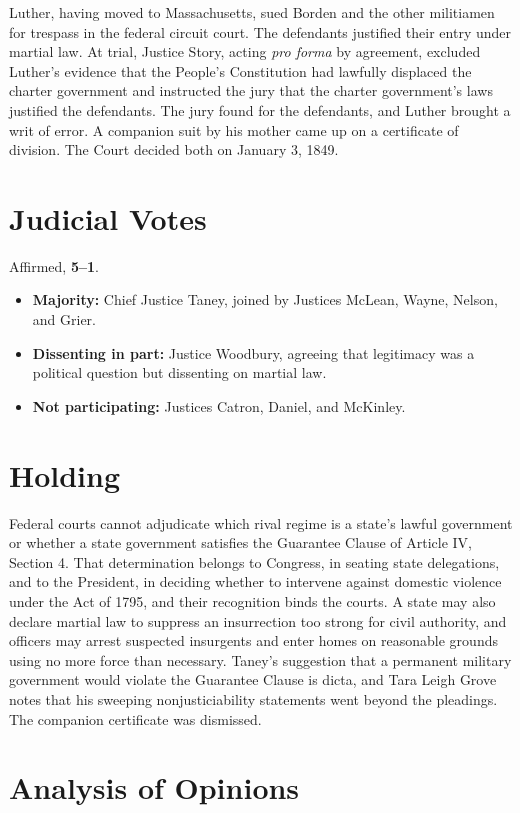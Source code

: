 \documentclass[12pt]{article}
\begin{document}
Luther, having moved to Massachusetts, sued Borden and the other militiamen for trespass in the federal circuit court. The defendants justified their entry under martial law. At trial, Justice Story, acting \textit{pro forma} by agreement, excluded Luther's evidence that the People's Constitution had lawfully displaced the charter government and instructed the jury that the charter government's laws justified the defendants. The jury found for the defendants, and Luther brought a writ of error. A companion suit by his mother came up on a certificate of division. The Court decided both on January 3, 1849.

\section{Judicial Votes}

Affirmed, \textbf{5--1}.
\begin{itemize}
\item \textbf{Majority:} Chief Justice Taney, joined by Justices McLean, Wayne, Nelson, and Grier.
\item \textbf{Dissenting in part:} Justice Woodbury, agreeing that legitimacy was a political question but dissenting on martial law.
\item \textbf{Not participating:} Justices Catron, Daniel, and McKinley.
\end{itemize}

\section{Holding}

Federal courts cannot adjudicate which rival regime is a state's lawful government or whether a state government satisfies the Guarantee Clause of Article IV, Section 4. That determination belongs to Congress, in seating state delegations, and to the President, in deciding whether to intervene against domestic violence under the Act of 1795, and their recognition binds the courts. A state may also declare martial law to suppress an insurrection too strong for civil authority, and officers may arrest suspected insurgents and enter homes on reasonable grounds using no more force than necessary. Taney's suggestion that a permanent military government would violate the Guarantee Clause is dicta, and Tara Leigh Grove notes that his sweeping nonjusticiability statements went beyond the pleadings. The companion certificate was dismissed.

\section{Analysis of Opinions}
\end{document}
